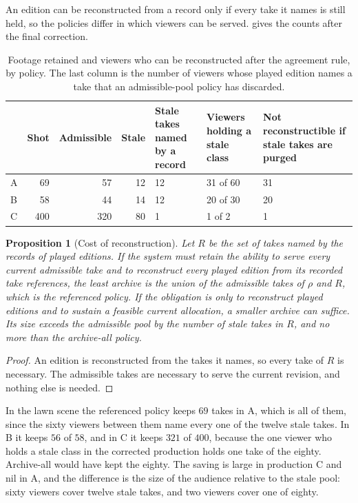 \documentclass[11pt,twoside,openright]{book}
\theoremstyle{plain}
\newtheorem{proposition}[theorem]{Proposition}
\theoremstyle{definition}
\theoremstyle{remark}
\begin{document}
An edition can be reconstructed from a record only if every take it names is still held, so the policies differ in which viewers can be served.  gives the counts after the final correction.

\begin{table}[ht]
\centering
\begin{tabular}{@{}lrrrp{2.1cm}p{2.2cm}p{2.4cm}@{}}
\toprule
 & Shot & Admissible & Stale & Stale takes named by a record & Viewers holding a stale class & Not reconstructible if stale takes are purged\\
\midrule
A & 69 & 57 & 12 & 12 & 31 of 60 & 31\\
B & 58 & 44 & 14 & 12 & 20 of 30 & 20\\
C & 400 & 320 & 80 & 1 & 1 of 2 & 1\\
\bottomrule
\end{tabular}
\caption{Footage retained and viewers who can be reconstructed after the agreement rule, by policy. The last column is the number of viewers whose played edition names a take that an admissible-pool policy has discarded.}\label{tab:ret12}
\end{table}

\begin{proposition}[Cost of reconstruction]\label{prop:retain}
Let $R$ be the set of takes named by the records of played editions. If the system must retain the ability to serve every current admissible take and to reconstruct every played edition from its recorded take references, the least archive is the union of the admissible takes of $\rho$ and $R$, which is the referenced policy. If the obligation is only to reconstruct played editions and to sustain a feasible current allocation, a smaller archive can suffice. Its size exceeds the admissible pool by the number of stale takes in $R$, and no more than the archive-all policy.
\end{proposition}

\begin{proof}
An edition is reconstructed from the takes it names, so every take of $R$ is necessary. The admissible takes are necessary to serve the current revision, and nothing else is needed.
\end{proof}

In the lawn scene the referenced policy keeps $69$ takes in A, which is all of them, since the sixty viewers between them name every one of the twelve stale takes. In B it keeps $56$ of $58$, and in C it keeps $321$ of $400$, because the one viewer who holds a stale class in the corrected production holds one take of the eighty. Archive-all would have kept the eighty. The saving is large in production C and nil in A, and the difference is the size of the audience relative to the stale pool: sixty viewers cover twelve stale takes, and two viewers cover one of eighty.
\end{document}
